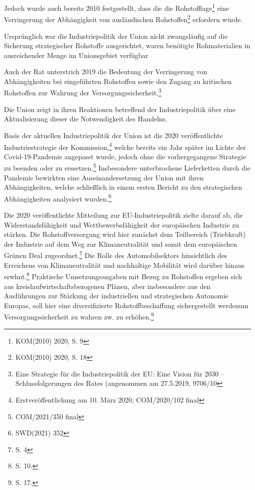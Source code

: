 \documentclass[12pt,a4paper,oneside]{book} %
\begin{document}
Jedoch wurde auch bereits 2010 festgestellt, dass die die \glqq Rohstofflage\grqq \footnote{KOM(2010) 2020, S. 9} eine Verringerung der Abhängigkeit von ausländischen Rohstoffen\footnote{KOM(2010) 2020, S. 18} erfordern würde.

Ursprünglich war die Industriepolitik der Union nicht zwangsläufig auf die Sicherung strategischer Rohstoffe ausgerichtet, waren benötigte Rohmaterialien in ausreichender Menge im Unionsgebiet verfügbar

Auch der Rat unterstrich 2019 die Bedeutung der Verringerung von Abhängigkeiten bei eingeführten Rohstoffen sowie den Zugang zu kritischen Rohstoffen zur Wahrung der Versorgungssicherheit.\footnote{Eine Strategie für die Industriepolitik der EU: Eine Vision für 2030 – Schlussfolgerungen des Rates (angenommen am 27.5.2019, 9706/10}
	
Die Union zeigt in ihren Reaktionen betreffend der Industriepolitik über eine Aktualisierung dieser die Notwendigkeit des Handelns.
	
Basis der aktuellen Industriepolitik der Union ist die 2020 veröffentlichte Industriestrategie der Kommission,\footnote{Erstveröffentlichung am 10. März 2020, COM/2020/102 final} welche bereits ein Jahr später im Lichte der Covid-19-Pandemie angepasst wurde, jedoch ohne die vorhergegangene Strategie zu beenden oder zu erssetzen.\footnote{COM/2021/350 final}	Insbesondere unterbrochene Lieferketten durch die Pandemie bewirkten eine Auseinandersetzung der Union mit ihren Abhängigkeiten, welche schließlich in einem ersten Bericht zu den strategischen Abhängigkeiten analysiert wurden.\footnote{SWD(2021) 352}

Die 2020 veröffentlichte Mitteilung zur EU-Industriepolitik zielte darauf ab, die Widerstandsfähigkeit und Wettbewerbsfähigkeit der europäischen Industrie zu stärken. Die Rohstoffversorgung wird hier zunächst dem Teilbereich (\glqq Triebkraft\grqq) der Industrie auf dem Weg zur Klimaneutralität und somit dem europäischen Grünen Deal zugeordnet.\footnote{S. 4} Die Rolle des Automobilsektors hinsichtlich des Erreichens von Klimaneutralität und nachhaltige Mobilität wird darüber hinaus erwhnt.\footnote{S. 10.} Praktische Umsetzungsangaben mit Bezug zu Rohstoffen ergeben sich aus kreislaufwirtschaftsbezogenen Plänen, aber insbesondere aus den Ausführungen zur Stärkung der industriellen und strategischen Autonomie Europas, soll hier eine \glqq diversifizierte Rohstoffbeschaffung sichergestellt werden\glqq um Versorgungssicherheit zu wahren zw. zu erhöhen.\footnote{S. 17.}
\end{document}

